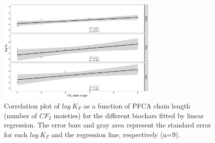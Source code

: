 \begin{figure}[tb]
    \centering
    \includegraphics[width=0.7\textwidth]{R/figs/chainlength_KF.pdf}
    \caption{Correlation plot of $log~K_F$ as a function of PFCA chain length (number of $CF_2$ moieties) for the different biochars fitted by linear regression. The error bars and gray area represent the standard error for each $log~K_F$ and the regression line, respectively (n=9).}
    \label{fig:chainlength}
\end{figure}

